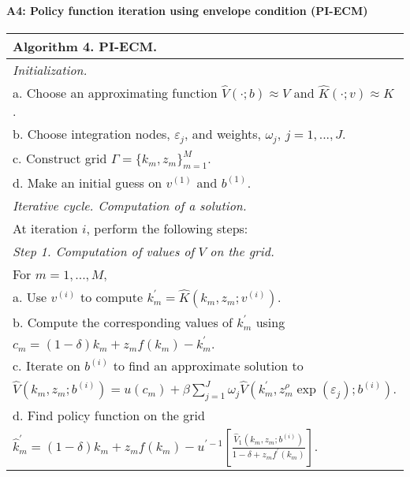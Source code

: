 \newpage

\paragraph{A4: Policy function iteration using envelope condition (PI-ECM)}

\qquad

\qquad

{\small
\begin{tabular}{l}
\hline \hline
\textbf{Algorithm 4. PI-ECM.} \\ \hline
\emph{Initialization.} \\
\quad a. Choose an approximating function $\widehat{V}(\cdot ;b)\approx V$
and $\widehat{K}(\cdot ;v)\approx K$. \\
\quad b. Choose integration nodes, $\varepsilon _{j}$, and weights, $\omega
_{j}$, $j=1,...,J$. \\
\quad c. Construct grid $\Gamma =\{k_{m},z_{m}\}_{m=1}^{M}$. \\
\quad d. Make an initial guess on $v^{(1)}$ and $b^{(1)}$. \\ \hline
\emph{Iterative cycle. Computation of a solution.} \\ \hline
\quad At iteration $i$, perform the following steps: \\
\emph{Step 1. Computation of values of }$V$ \emph{on the grid.} \\
\quad For $m=1,...,M,$ \\
\quad a. Use $v^{\left( i\right) }$ to compute $k_{m}^{\prime }=\widehat{K}
\left( k_{m},z_{m};v^{\left( i\right) }\right) $. \\
\quad b. Compute the corresponding values of $k_{m}^{\prime }$ using \\
\quad $c_{m}=(1-\delta )k_{m}+z_{m}f\left( k_{m}\right) -k_{m}^{\prime }.$
\\
\quad c. Iterate on $b^{\left( i\right) }$ to find an approximate solution to
\\
\quad $\widehat{V}\left( k_{m},z_{m};b^{(i)}\right) =u\left( c_{m}\right)
+\beta \sum_{j=1}^{J}\omega _{j}\widehat{V}\left( k_{m}^{\prime
},z_{m}^{\rho }\exp \left( \varepsilon _{j}\right) ;b^{(i)}\right) $. \\
\quad d. Find policy function on the grid \\
\quad $\widehat{k}_{m}^{\prime }=(1-\delta )k_{m}+z_{m}f\left( k_{m}\right)
-u^{\prime -1}\left[ \frac{\widehat{V}_{1}\left( k_{m},z_{m};b^{\left(
i\right) }\right) }{1-\delta +z_{m}f^{\prime }\left( k_{m}\right) }\right] .$

\end{tabular}}
